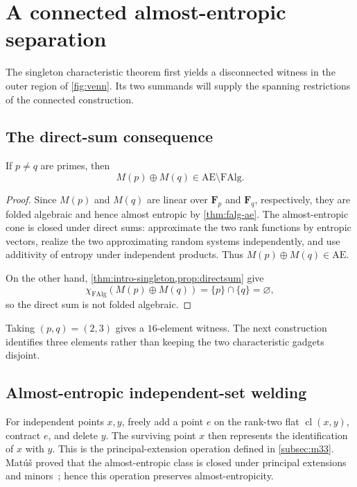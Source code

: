 \documentclass[11pt]{article}
\theoremstyle{definition}
\newcommand{\cl}{\operatorname{cl}}
\newcommand{\FAlg}{\mathrm{FAlg}}
\newcommand{\AlmostEnt}{\mathrm{AE}}
\begin{document}
\section{A connected almost-entropic separation}\label{sec:separation}

The singleton characteristic theorem first yields a disconnected witness in the outer region of \cref{fig:venn}.  Its two summands will supply the spanning restrictions of the connected construction.

\subsection{The direct-sum consequence}

\begin{corollary}\label{cor:direct-separation}
If $p\ne q$ are primes, then
\[
M(p)\oplus M(q)\in\AlmostEnt\setminus\FAlg.
\]
\end{corollary}
\begin{proof}
Since $M(p)$ and $M(q)$ are linear over $\mathbf F_p$ and $\mathbf F_q$, respectively, they are folded algebraic and hence almost entropic by \cref{thm:falg-ae}.  The almost-entropic cone is closed under direct sums: approximate the two rank functions by entropic vectors, realize the two approximating random systems independently, and use additivity of entropy under independent products.  Thus $M(p)\oplus M(q)\in\AlmostEnt$.

On the other hand, \cref{thm:intro-singleton,prop:directsum} give
\[
\chi_{\FAlg}(M(p)\oplus M(q))=\{p\}\cap\{q\}=\varnothing,
\]
so the direct sum is not folded algebraic.
\end{proof}

Taking $(p,q)=(2,3)$ gives a $16$-element witness.  The next construction identifies three elements rather than keeping the two characteristic gadgets disjoint.

\subsection{Almost-entropic independent-set welding}

For independent points $x,y$, freely add a point $e$ on the rank-two flat $\cl(x,y)$, contract $e$, and delete $y$.  The surviving point $x$ then represents the identification of $x$ with $y$.  This is the principal-extension operation defined in \cref{subsec:m33}.  Mat\'u\v{s} proved that the almost-entropic class is closed under principal extensions and minors~\cite{Matus2018}; hence this operation preserves almost-entropicity.
\end{document}
